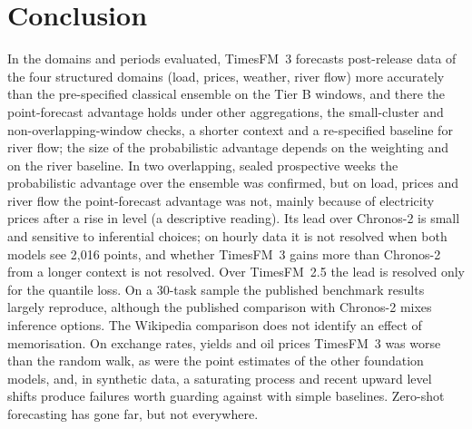 \section{Conclusion}

In the domains and periods evaluated, TimesFM~3 forecasts post-release data of the four structured domains (load, prices, weather, river flow) more accurately than the
pre-specified classical ensemble on the Tier B windows, and there the point-forecast advantage holds under other aggregations, the small-cluster and non-overlapping-window checks, a
shorter context and a re-specified baseline for river flow; the size of the probabilistic advantage depends on the weighting and on
the river baseline. In two overlapping, sealed prospective weeks the probabilistic advantage over the ensemble was confirmed, but on load, prices and
river flow the point-forecast advantage was not, mainly because of electricity prices after a rise in level (a descriptive
reading). Its lead over Chronos-2 is small and sensitive to inferential choices; on hourly data it is not resolved when both
models see 2{,}016 points, and whether TimesFM~3 gains more than Chronos-2 from a longer context is not resolved. Over TimesFM~2.5
the lead is resolved only for the quantile loss. On a 30-task sample
the published benchmark results largely reproduce, although the published comparison with Chronos-2 mixes inference options. The
Wikipedia comparison does not identify an effect of memorisation. On exchange rates, yields and oil prices TimesFM~3 was worse than the random walk, as
were the point estimates of the other foundation models, and, in synthetic data, a saturating process and recent upward level shifts produce failures
worth guarding against with simple baselines. Zero-shot forecasting has gone far, but not everywhere.
